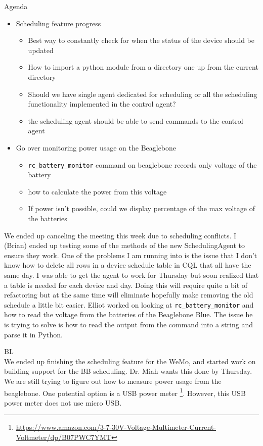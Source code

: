 \documentclass[fontsize=11pt, %
                             paper=letter, %
                             openany, %
                             captions=tableheading,
                             index=totoc,
                             hyperref]{labbook}
\begin{document}
Agenda
\begin{itemize}
\item Scheduling feature progress
\begin{itemize}
\item Best way to constantly check for when the status of the device should be updated
\item How to import a python module from a directory one up from the current directory
\item Should we have single agent dedicated for scheduling or all the scheduling functionality implemented in the control agent? 
\item the scheduling agent should be able to send commands to the control agent
\end{itemize}
\item Go over monitoring power usage on the Beaglebone
\begin{itemize}
\item \texttt{rc\_battery\_monitor} command on beaglebone records only voltage of the battery
\item how to calculate the power from this voltage
\item If power isn't possible, could we display percentage of the max voltage of the batteries
\end{itemize}
\end{itemize}
We ended up canceling the meeting this week due to scheduling conflicts.
\medbreak\noindent
I (Brian) ended up testing some of the methods of the new SchedulingAgent to ensure they work. One of the problems I am running into is the issue that I don't know how to delete all rows in a device schedule table in CQL that all have the same day. I was able to get the agent to work for Thursday but soon realized that a table is needed for each device and day. Doing this will require quite a bit of refactoring but at the same time will eliminate hopefully make removing the old schedule a little bit easier. Elliot worked on looking at \texttt{rc\_battery\_monitor} and how to read the voltage from the batteries of the Beaglebone Blue. The issue he is trying to solve is how to read the output from the command into a string and parse it in Python.

BL\\
\smallbreak\noindent
We ended up finishing the scheduling feature for the WeMo, and started work on building support for the BB scheduling. Dr. Miah wants this done by Thursday. We are still trying to figure out how to measure power usage from the beaglebone. One potential option is a USB power meter \footnote{\url{https://www.amazon.com/3-7-30V-Voltage-Multimeter-Current-Voltmeter/dp/B07PWC7YMT}}. However, this USB power meter does not use micro USB.
\end{document}

